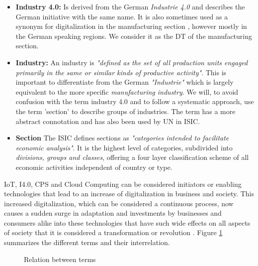 \begin{itemize}
  \item  \textbf{Industry 4.0:} Is derived from the German \emph{Industrie 4.0} and describes the German initiative with the same name. It is also sometimes used as a synonym for digitalization in the manufacturing section \cite{McKinseydigitizationIndustrialSector:2015}, however mostly in the German speaking regions. We consider it as the \acl{DT} of the manufacturing section.


  \item \textbf{Industry:} An industry is \emph{"defined as the set of all production units engaged primarily in the same or similar kinds of productive activity"}\cite{ISIC:2008}. This is important to differentiate from the German \emph{"Industrie"} which is largely equivalent to the more specific \emph{manufacturing industry}. We will, to avoid confusion with the term industry 4.0 and to follow a systematic approach, use the term 'section' to describe groups of industries. The term has a more abstract connotation and has also been used by \ac{UN} in \ac{ISIC}\cite{ISIC:2008}.

\item \textbf{Section} The \acf{ISIC} defines sections as  \emph{"categories intended to facilitate economic analysis"}\cite{ISIC:2008}. It is the highest level of categories, subdivided into \emph{divisions, groups and classes}, offering a four layer classification scheme of all economic activities independent of country or type. 

\end{itemize}

\ac{IoT}, \ac{I4.0}, \ac{CPS} and Cloud Computing can be considered initiators or enabling technologies that lead to an increase of digitalization in business and society. This increased digitalization, which can be considered a continuous process, now causes a sudden surge in adaptation and investments by businesses and consumers alike into these technologies that have such wide effects on all aspects of society that it is considered a transformation or revolution \cite{Kagermann:2013}.
Figure \ref{fig:terms} summarizes the different terms and their interrelation.

\begin{figure}[H]
\centering
{}
\caption{Relation between terms} \label{fig:terms}
\end{figure}

